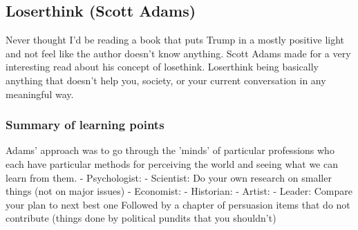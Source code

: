\subsection{Loserthink (Scott Adams)}

Never thought I'd be reading a book that puts Trump in a mostly positive light and not feel like the author doesn't know anything.
Scott Adams made for a very interesting read about his concept of losethink. Loserthink being basically anything that doesn't help you, society, or your current conversation in any meaningful way.

\subsubsection{Summary of learning points}
Adams' approach was to go through the 'minds' of particular professions who each have particular methods for perceiving the world and seeing what we can learn from them.
- Psychologist:
- Scientist: Do your own research on smaller things (not on major issues)
- Economist:
- Historian:
- Artist:
- Leader: Compare your plan to next best one
Followed by a chapter of persuasion items that do not contribute (things done by political pundits that you shouldn't)
